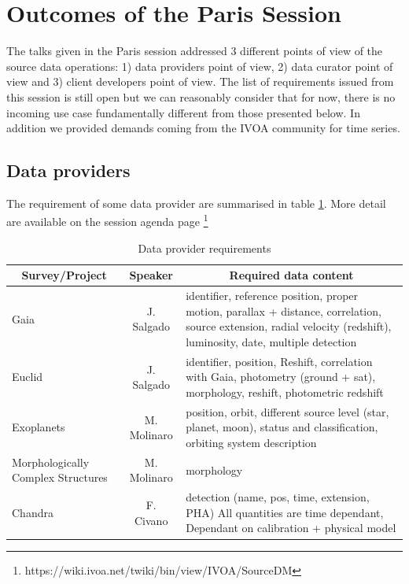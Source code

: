 \documentclass[11pt,a4paper]{ivoa}
\begin{document}
\section{Outcomes of the Paris Session}
The talks given in the Paris session addressed 3 different points of view of the source data operations: 1) data providers point of view, 2) data curator  point of view and 3) client developers point of view. 
The list of requirements issued from this session is still open but we can reasonably consider that for now, there is no incoming use case fundamentally different from those presented below.
In addition we provided demands coming from the IVOA community for time series.
\subsection{Data providers}
The requirement of some data provider are summarised in table \ref{table:tsurvey}. More detail are available on the session agenda page
\footnote{https://wiki.ivoa.net/twiki/bin/view/IVOA/SourceDM}%

\begin{table}[!ht]
\begin{tabular}{|p{7em}|c|p{17em}|}
  \hline
  \multicolumn{1}{|c}{\bfseries Survey/Project} & \multicolumn{1}{|c}{\bfseries Speaker} & \multicolumn{1}{|c|}{\bfseries Required data content}
  \\
  \hline
  Gaia & J. Salgado & 
identifier, reference position, proper motion, parallax + distance, correlation, source extension, radial velocity (redshift), luminosity, date, multiple detection
 \\
  \hline
  Euclid & J. Salgado & 
identifier, position, Reshift, correlation with Gaia, photometry (ground + sat), morphology, reshift, photometric redshift
 \\
  \hline
  Exoplanets & M. Molinaro & 
position, orbit, different source level (star, planet, moon), status and classification, orbiting system description
\\
  \hline
Morphologically Complex Structures & M. Molinaro & morphology
\\
  \hline
  Chandra & F. Civano & 
detection (name, pos, time, extension, PHA)
All quantities are time dependant, Dependant on calibration + physical model
\\
  \hline
\end{tabular}
\caption{Data provider requirements}
\label{table:tsurvey}
\end{table}
\end{document}
